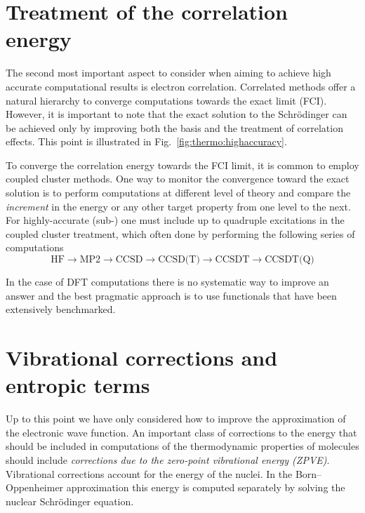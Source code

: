 \documentclass[../Main/chem371-notes.tex]{subfiles}
\begin{document}
\section{Treatment of the correlation energy}

The second most important aspect to consider when aiming to achieve high accurate computational results is electron correlation.
Correlated methods offer a natural hierarchy to converge computations towards the exact limit (FCI).
However, it is important to note that the exact solution to the Schr\"{o}dinger can be achieved only by improving both the basis and the treatment of correlation effects.
This point is illustrated in Fig.~\ref{fig:thermo:highaccuracy}.

To converge the correlation energy towards the FCI limit, it is common to employ coupled cluster methods.
One way to monitor the convergence toward the exact solution is to perform computations at different level of theory and compare the \emph{increment} in the energy or any other target property from one level to the next.
For highly-accurate (sub-\kcal) one must include up to quadruple excitations in the coupled cluster treatment, which often done by performing the following series of computations
\begin{equation}
\text{HF} \rightarrow \text{MP2} \rightarrow \text{CCSD} \rightarrow \text{CCSD(T)} \rightarrow \text{CCSDT} \rightarrow \text{CCSDT(Q)}
\end{equation}

In the case of DFT computations there is no systematic way to improve an answer and the best pragmatic approach is to use functionals that have been extensively benchmarked.

\section{Vibrational corrections and entropic terms}

Up to this point we have only considered how to improve the approximation of the electronic wave function.
An important class of corrections to the energy that should be included in computations of the thermodynamic properties of molecules should include \emph{corrections due to the zero-point vibrational energy (ZPVE)}.
Vibrational corrections account for the energy of the nuclei.
In the Born--Oppenheimer approximation this energy is computed separately by solving the nuclear Schr\"{o}dinger equation.
\end{document}
